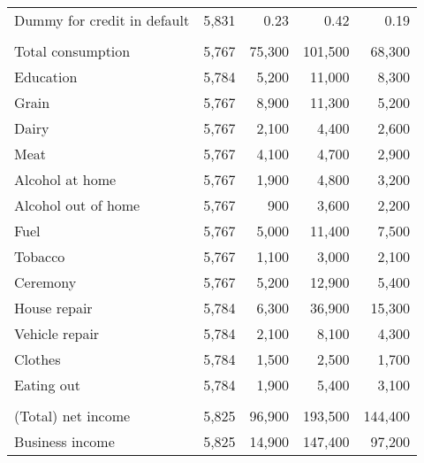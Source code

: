 \documentclass{report}
\begin{document}
\begin{table}[H]
{\begin{tabular}{lrrrr}
\hspace{1em}Dummy for credit in default & 5,831 & 0.23 & 0.42 & 0.19\\
\addlinespace[0.3em]
\multicolumn{5}{l}{\textbf{Consumption variables}}\\
\hspace{1em}Total consumption & 5,767 & 75,300 & 101,500 & 68,300\\
\hspace{1em}Education & 5,784 & 5,200 & 11,000 & 8,300\\
\hspace{1em}Grain & 5,767 & 8,900 & 11,300 & 5,200\\
\hspace{1em}Dairy & 5,767 & 2,100 & 4,400 & 2,600\\
\hspace{1em}Meat & 5,767 & 4,100 & 4,700 & 2,900\\
\hspace{1em}Alcohol at home & 5,767 & 1,900 & 4,800 & 3,200\\
\hspace{1em}Alcohol out of home & 5,767 & 900 & 3,600 & 2,200\\
\hspace{1em}Fuel & 5,767 & 5,000 & 11,400 & 7,500\\
\hspace{1em}Tobacco & 5,767 & 1,100 & 3,000 & 2,100\\
\hspace{1em}Ceremony & 5,767 & 5,200 & 12,900 & 5,400\\
\hspace{1em}House repair & 5,784 & 6,300 & 36,900 & 15,300\\
\hspace{1em}Vehicle repair & 5,784 & 2,100 & 8,100 & 4,300\\
\hspace{1em}Clothes & 5,784 & 1,500 & 2,500 & 1,700\\
\hspace{1em}Eating out & 5,784 & 1,900 & 5,400 & 3,100\\
\addlinespace[0.3em]
\multicolumn{5}{l}{\textbf{Income and asset variables}}\\
\hspace{1em}(Total) net income & 5,825 & 96,900 & 193,500 & 144,400\\
\hspace{1em}Business income & 5,825 & 14,900 & 147,400 & 97,200\\

\end{tabular}}
\end{table}
\end{document}
